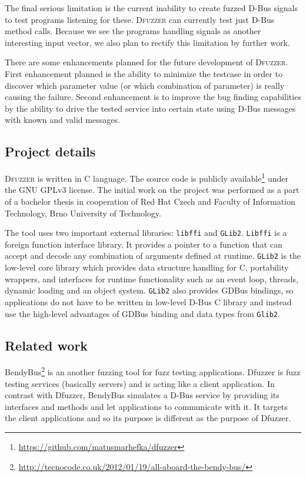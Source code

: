 \documentclass[conference]{IEEEtran}
\begin{document}
The final serious limitation is the current inability to create fuzzed D-Bus
signals to test programs listening for these. \textsc{Dfuzzer} can currently
test just D-Bus method calls. Because we see the programs handling signals as
another interesting input vector, we also plan to rectify this limitation by
further work.


There are some enhancements planned for the future development of
\textsc{Dfuzzer}. First enhancement planned is the ability to minimize the
testcase in order to discover which parameter value (or which combination of
parameter) is really causing the failure. Second enhancement is to improve the
bug finding capabilities by the ability to drive the tested service into certain
state using D-Bus messages with known and valid messages.


\subsection{Project details}
\textsc{Dfuzzer} is written in C language. The source code is publicly
available\footnote{\url{https://github.com/matusmarhefka/dfuzzer}} under the GNU
GPLv3 license. The initial work on the project was performed as a part of a bachelor
thesis in cooperation of Red Hat Czech and Faculty of Information Technology, Brno
University of Technology.

The tool uses two important external libraries: \texttt{libffi} and
\texttt{GLib2}. \texttt{Libffi} is a foreign function interface library. It
provides a pointer to a function that can accept and decode any combination of
arguments defined at runtime.  \texttt{GLib2} is the low-level core library
which provides data structure handling for C, portability wrappers, and
interfaces for runtime functionality such as an event loop, threads, dynamic
loading and an object system.  \texttt{GLib2} also provides GDBus bindings, so
applications do not have to be written in low-level D-Bus C library and instead
use the high-level advantages of GDBus binding and data types from
\texttt{Glib2}.

\subsection{Related work}
BendyBus\footnote{\url{http://tecnocode.co.uk/2012/01/19/all-aboard-the-bendy-bus/}}
is an another fuzzing tool for fuzz testing applications. Dfuzzer is fuzz
testing services (basically servers) and is acting like a client application.
In contrast with Dfuzzer, BendyBus simulates a D-Bus service by providing its
interfaces and methods and let applications to communicate with it. It targets
the client applications and so its purpose is different as the purpose of Dfuzzer.
\end{document}
